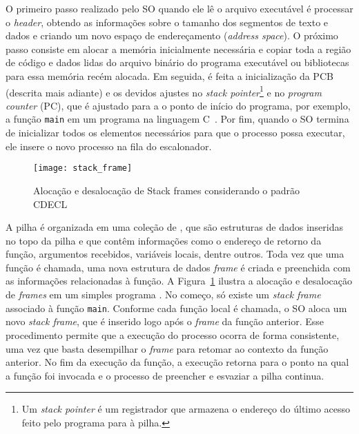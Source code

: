 O primeiro passo realizado pelo SO quando ele lê o arquivo executável é processar o \emph{header}, obtendo as informações sobre o tamanho dos segmentos de
texto e dados e criando um novo espaço de endereçamento (\emph{address space}).
O próximo passo consiste em alocar a memória inicialmente necessária e copiar
toda a região de código e dados lidas do arquivo binário do programa executável ou bibliotecas para essa memória
recém alocada. Em seguida, é feita a inicialização da PCB (descrita mais adiante)
e os devidos ajustes no \emph{stack pointer}\footnote{Um \emph{stack pointer} é
um registrador que armazena o endereço do último acesso feito pelo programa
para à pilha.} e no \emph{program counter} (PC), que é ajustado para a
o ponto de início do programa, por exemplo, a função \texttt{main} em um programa na linguagem C~\citep{patterson}. Por fim, quando o SO termina
de inicializar todos os elementos necessários para que o processo possa
executar, ele insere o novo processo na fila do escalonador.

\begin{figure}[!h]
  \centering
  \texttt{[image: stack\_frame]}
	\caption[Alocação e desalocação de Stack frames considerando o padrão CDECL]{Alocação e desalocação de Stack frames considerando o padrão CDECL~\citep{patterson}}
  \label{fig:stack_frames} 
\end{figure}


A pilha é organizada em uma coleção de , que
são estruturas de dados inseridas no topo da pilha e que contêm
informações como o endereço de retorno da função, argumentos recebidos,
variáveis locais, dentre outros. Toda vez que uma função é chamada, uma nova
estrutura de dados \emph{frame} é criada e preenchida com as informações
relacionadas à função.  A Figura~\ref{fig:stack_frames} ilustra a alocação e
desalocação de \textit{frames} em um simples programa \citep{gdb}. No começo,
só existe um \emph{stack frame} associado à função \texttt{main}. Conforme cada
função local é chamada, o SO aloca um novo \emph{stack frame}, que é inserido
logo após o \emph{frame} da função anterior. Esse procedimento permite que a
execução do processo ocorra de forma consistente, uma vez que basta desempilhar
o \emph{frame} para retomar ao contexto da função anterior. No fim da execução
da função, a execução retorna para o ponto na qual a função foi invocada e o
processo de preencher e esvaziar a pilha continua.

